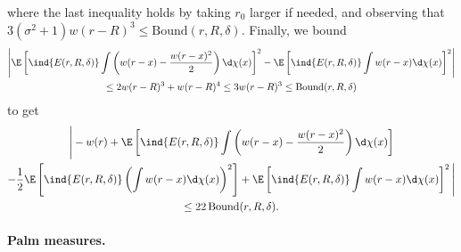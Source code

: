\documentclass[10pt,a4paper]{article}
\begin{document}
where the last inequality holds by taking $r_0$ larger if needed, and observing that $3(\sigma^2+1)w(r-R)^3 \leq \mathrm{Bound}(r,R,\delta)$. Finally, we bound 
\begin{multline*}
\left| \E\left[ \ind{E(r,R,\delta)} \int \left( w(r-x) - \frac{w(r-x)^2}{2} \right) \d\chi(x) \right]^2 - \E\left[ \ind{E(r,R,\delta)} \int w(r-x) \d\chi(x) \right]^2 \right| \\
\leq 2w(r-R)^3 + w(r-R)^4 \leq 3 w(r-R)^3 \leq \mathrm{Bound}(r,R,\delta)
\end{multline*}
to get 
\begin{multline}\label{eq:approx-w-without-exp-pp}
\Bigg| - w(r) + \E\left[ \ind{E(r,R,\delta)} \int \left( w(r-x) - \frac{w(r-x)^2}{2} \right) \d\chi(x) \right] \\
- \frac{1}{2} \E\left[\ind{E(r,R,\delta)} \left(\int w(r-x) \d\chi(x) \right)^2\right] + \E\left[ \ind{E(r,R,\delta)} \int w(r-x) \d\chi(x) \right]^2 \Bigg| \\
\leq 22 \, \mathrm{Bound}(r,R,\delta) .
\end{multline}



\paragraph{Palm measures.} 
\end{document}
